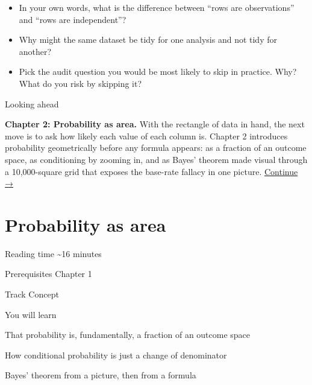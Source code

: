 \documentclass[
  letterpaper,
  11pt,
  twoside,
  openany]{scrbook}
\providecommand{\tightlist}{%
  \setlength{\itemsep}{0pt}\setlength{\parskip}{0pt}}
\begin{document}
\begin{tcolorbox}[enhanced jigsaw, arc=.35mm, bottomrule=.15mm, bottomtitle=1mm, breakable, colback=white, colbacktitle=quarto-callout-caution-color!10!white, colframe=quarto-callout-caution-color-frame, coltitle=black, left=2mm, leftrule=.75mm, opacityback=0, opacitybacktitle=0.6, rightrule=.15mm, title=\textcolor{quarto-callout-caution-color}{\faFire}\hspace{0.5em}{Reflect before moving on}, titlerule=0mm, toprule=.15mm, toptitle=1mm]

\begin{itemize}
\tightlist
\item
  In your own words, what is the difference between ``rows are
  observations'' and ``rows are independent''?
\item
  Why might the same dataset be tidy for one analysis and not tidy for
  another?
\item
  Pick the audit question you would be most likely to skip in practice.
  Why? What do you risk by skipping it?
\end{itemize}

\end{tcolorbox}

{Looking ahead}

\textbf{Chapter 2: Probability as area.} With the rectangle of data in
hand, the next move is to ask how likely each value of each column is.
Chapter 2 introduces probability geometrically before any formula
appears: as a fraction of an outcome space, as conditioning by zooming
in, and as Bayes' theorem made visual through a 10,000-square grid that
exposes the base-rate fallacy in one picture.
\href{02-probability-as-area.qmd}{Continue →}

\chapter{Probability as area}\label{probability-as-area}

{Reading time} {\textasciitilde16 minutes}

{Prerequisites} {Chapter 1}

{Track} {Concept}

{You will learn}

That probability is, fundamentally, a fraction of an outcome space

How conditional probability is just a change of denominator

Bayes' theorem from a picture, then from a formula
\end{document}
